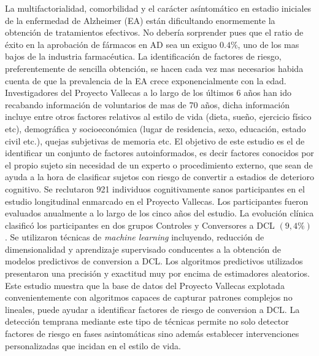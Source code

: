\documentclass[11pt]{article}
\begin{document}
La multifactorialidad, comorbilidad y el carácter asíntomático en estadio iniciales de la enfermedad de Alzheimer (EA) están dificultando enormemente la obtención de tratamientos efectivos. No debería sorprender pues que el ratio de éxito en la aprobación de fármacos en AD sea un exiguo $0.4\%$, uno de los mas bajos de la industria farmacéutica. 
La identificación de factores de riesgo, preferentemente de sencilla obtención, se hacen cada vez mas necesarios habida cuenta de que la prevalencia de la EA crece exponencialmente con la edad. 
Investigadores del Proyecto Vallecas a lo largo de los últimos 6 años han ido recabando información de voluntarios de mas de 70 años, dicha información incluye entre otros factores relativos al estilo de vida (dieta, sueño, ejercicio físico etc), demográfica y socioeconómica (lugar de residencia, sexo, educación, estado civil etc.), quejas subjetivas de memoria etc.
El objetivo de este estudio es el de identificar un conjunto de factores autoinformados, es decir factores conocidos por el propio sujeto sin necesidad de un experto o procedimiento externo, que sean de ayuda a la hora de clasificar sujetos con riesgo de convertir a estadios de deterioro cognitivo. 
Se reclutaron 921 individuos cognitivamente sanos participantes en el estudio longitudinal enmarcado en el Proyecto Vallecas. Los participantes fueron evaluados anualmente a lo largo de los cinco años del estudio. La evolución clínica clasificó los participantes en dos grupos Controles y Conversores a DCL $(9,4\%)$. 
Se utilizaron técnicas de \emph{machine learning} incluyendo, reducción de dimensionalidad y aprendizaje supervisado conducentes a la obtención de modelos predictivos de conversion a DCL. Los algoritmos predictivos utilizados presentaron una precisión y exactitud muy por encima de estimadores aleatorios.
Este estudio muestra que la base de datos del Proyecto Vallecas explotada convenientemente con algoritmos capaces de capturar patrones complejos no lineales, puede ayudar a identificar factores de riesgo de conversion a DCL. La detección temprana mediante este tipo de técnicas permite no solo detector factores de riesgo en fases asintomáticas sino además establecer intervenciones personalizadas que incidan en el estilo de vida.
\end{document}
